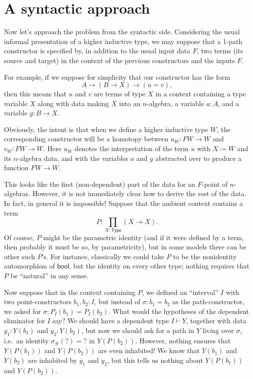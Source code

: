 \documentclass{amsart}
\begin{document}
\section{A syntactic approach}
\label{sec:syntactic}

Now let's approach the problem from the syntactic side.  Considering the usual informal presentation of a higher inductive type, we may suppose that a 1-path constructor is specified by, in addition to the usual input data $F$, two terms (its source and target) in the context of the previous constructors and the inputs $F$.

For example, if we suppose for simplicity that our constructor has the form
\begin{equation*}
  A \to (B \to X) \to (u = v),
\end{equation*}
then this means that $u$ and $v$ are terms of type $X$ in a context containing a type variable $X$ along with data making $X$ into an $n$-algebra, a variable $a:A$, and a variable $g:B\to X$.

Obviously, the intent is that when we define a higher inductive type $W$, the corresponding constructor will be a homotopy between $u_W:F W \to W$ and $v_W:F W \to W$.  Here $u_W$ denotes the interpretation of the term $u$ with $X\coloneqq W$ and its $n$-algebra data, and with the variables $a$ and $g$ abstracted over to produce a function $F W \to W$.

This looks like the first (non-dependent) part of the data for an $F$-point of $n$-algebras.  However, it is not immediately clear how to derive the rest of the data.  In fact, in general it is impossible!
Suppose that the ambient context contains a term
\[ P : \prod_{X:\mathsf{Type}} (X \to X). \]
Of course, $P$ might be the parametric identity (and if it were defined by a term, then probably it must be so, by parametricity), but in some models there can be other such $P$'s.  For instance, classically we could take $P$ to be the nonidentity automorphism of $\mathsf{bool}$, but the identity on every other type; nothing requires that $P$ be ``natural'' in any sense.

Now suppose that in the context containing $P$, we defined an ``interval'' $I$ with two point-constructors $b_1,b_2:I$, but instead of $\sigma:b_1=b_2$ as the path-constructor, we asked for $\sigma:P_I(b_1)=P_I(b_2)$.  What would the hypotheses of the dependent eliminator for $I$ say?  We should have a dependent type $I\vdash Y$, together with data $y_1:Y(b_1)$ and $y_2:Y(b_2)$, but now we should ask for a path in $Y$ living over $\sigma$, i.e.\ an identity $\sigma_{\#}(?) = ?$ in $Y(P(b_2))$.  However, nothing ensures that $Y(P(b_1))$ and $Y(P(b_2))$ are even inhabited!  We know that $Y(b_1)$ and $Y(b_2)$ are inhabited by $y_1$ and $y_2$, but this tells us nothing about $Y(P(b_1))$ and $Y(P(b_2))$.
\end{document}
